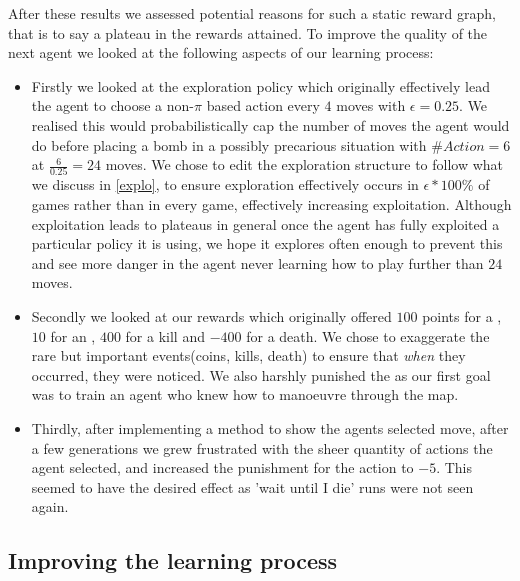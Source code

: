 After these results we assessed potential reasons for such a static reward graph, that is to say a plateau in the rewards attained. To improve the quality of the next agent we looked at the following aspects of our learning process:
\begin{itemize}
	\item Firstly we looked at the exploration policy which originally effectively lead the agent to choose a non-$\pi$ based action every $4$ moves with $\epsilon=0.25$. We realised this would probabilistically cap the number of moves the agent would do before placing a bomb in a possibly precarious situation with $\#Action=6$ at $\frac{6}{0.25}=24$ moves. We chose to edit the exploration structure to follow what we discuss in \ref{explo}, to ensure exploration effectively occurs in $\epsilon*100\%$ of games rather than in every game, effectively increasing exploitation. Although exploitation leads to plateaus in general once the agent has fully exploited a particular policy it is using, we hope it explores often enough to prevent this and see more danger in the agent never learning how to play further than $24$ moves. 
	\item Secondly we looked at our rewards which originally offered $100$ points for a , $10$ for an , $400$ for a kill and $-400$ for a death. We chose to exaggerate the rare but important events(coins, kills, death) to ensure that \textit{when} they occurred, they were noticed. We also harshly punished the  as our first goal was to train an agent who knew how to manoeuvre through the map.
	\item Thirdly, after implementing a method to show the agents selected move, after a few generations we grew frustrated with the sheer quantity of  actions the agent selected, and increased the punishment for the action to $-5$. This seemed to have the desired effect as 'wait until I die' runs were not seen again.
\end{itemize}

\subsection{Improving the learning process}
